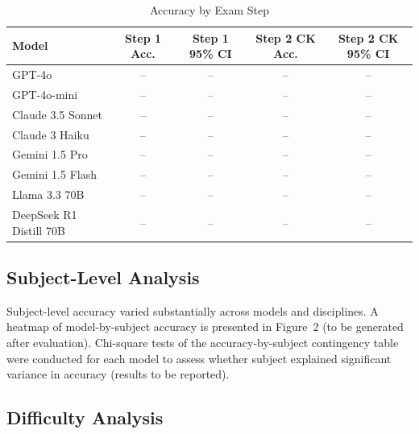 \begin{table}[htbp]
\centering
\caption{Accuracy by Exam Step}
\label{tab:accuracy_by_step}
\begin{tabular}{lcccc}
\toprule
Model & Step 1 Acc. & Step 1 95\% CI & Step 2 CK Acc. & Step 2 CK 95\% CI \\
\midrule
GPT-4o & -- & -- & -- & -- \\
GPT-4o-mini & -- & -- & -- & -- \\
Claude 3.5 Sonnet & -- & -- & -- & -- \\
Claude 3 Haiku & -- & -- & -- & -- \\
Gemini 1.5 Pro & -- & -- & -- & -- \\
Gemini 1.5 Flash & -- & -- & -- & -- \\
Llama 3.3 70B & -- & -- & -- & -- \\
DeepSeek R1 Distill 70B & -- & -- & -- & -- \\
\bottomrule
\end{tabular}
\end{table}

\subsection{Subject-Level Analysis}


Subject-level accuracy varied substantially across models and disciplines. A heatmap of model-by-subject accuracy is presented in Figure~2 (to be generated after evaluation). Chi-square tests of the accuracy-by-subject contingency table were conducted for each model to assess whether subject explained significant variance in accuracy (results to be reported).

\subsection{Difficulty Analysis}


